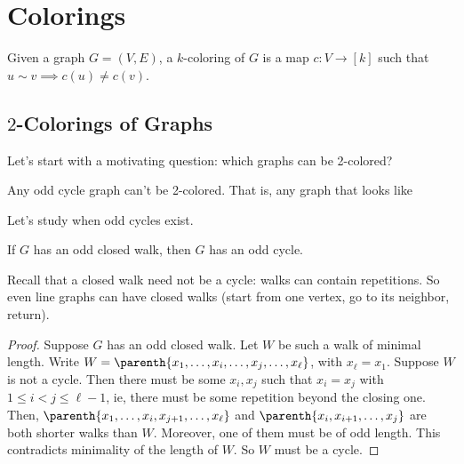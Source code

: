 \section{Colorings}

\begin{boxdefinition}[Coloring]
    Given a graph $G = (V, E)$, a $k$-coloring of $G$ is a map $c : V \to [k]$ such that $u \sim v \implies c(u) \ne c(v)$.
\end{boxdefinition}

\subsection{$2$-Colorings of Graphs}

Let's start with a motivating question: which graphs can be 2-colored?

Any odd cycle graph can't be 2-colored. That is, any graph that looks like
\begin{figure}[H]
    \centering
\end{figure}

Let's study when odd cycles exist.

\begin{boxlemma}\label{Ch1:Lemma:Odd_Closed_Walk}
    If $G$ has an odd closed walk, then $G$ has an odd cycle.
\end{boxlemma}
Recall that a closed walk need not be a cycle: walks can contain repetitions. So even line graphs can have closed walks (start from one vertex, go to its neighbor, return).
\begin{proof}
    Suppose $G$ has an odd closed walk. Let $W$ be such a walk of minimal length. Write $W = \parenth{x_1, \ldots, x_i, \ldots, x_j, \ldots, x_{\ell}}$, with $x_{\ell} = x_1$. Suppose $W$ is not a cycle. Then there must be some $x_i, x_j$ such that $x_i = x_j$ with $1 \leq i < j \leq \ell - 1$, ie, there must be some repetition beyond the closing one. Then, $\parenth{x_1, \ldots, x_i, x_{j+1}, \ldots, x_{\ell}}$ and $\parenth{x_i, x_{i+1}, \ldots, x_{j}}$ are both shorter walks than $W$. Moreover, one of them must be of odd length. This contradicts minimality of the length of $W$. So $W$ must be a cycle.
\end{proof}

